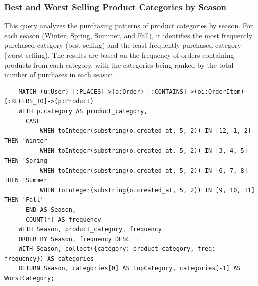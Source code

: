 \documentclass[a4paper,12pt]{article}
\begin{document}
\subsubsection{Best and Worst Selling Product Categories by Season}
This query analyzes the purchasing patterns of product categories by season. For each season (Winter, Spring, Summer, and Fall),
it identifies the most frequently purchased category (best-selling) and the least frequently purchased category (worst-selling).
The results are based on the frequency of orders containing products from each category, with the categories being ranked by the total number of purchases in each season.
\begin{verbatim}
    MATCH (u:User)-[:PLACES]->(o:Order)-[:CONTAINS]->(oi:OrderItem)-[:REFERS_TO]->(p:Product)
    WITH p.category AS product_category, 
      CASE 
          WHEN toInteger(substring(o.created_at, 5, 2)) IN [12, 1, 2] THEN 'Winter'
          WHEN toInteger(substring(o.created_at, 5, 2)) IN [3, 4, 5] THEN 'Spring'
          WHEN toInteger(substring(o.created_at, 5, 2)) IN [6, 7, 8] THEN 'Summer'
          WHEN toInteger(substring(o.created_at, 5, 2)) IN [9, 10, 11] THEN 'Fall'
      END AS Season, 
      COUNT(*) AS frequency
    WITH Season, product_category, frequency
    ORDER BY Season, frequency DESC
    WITH Season, collect({category: product_category, freq: frequency}) AS categories
    RETURN Season, categories[0] AS TopCategory, categories[-1] AS WorstCategory;
\end{verbatim}  
\end{document}
